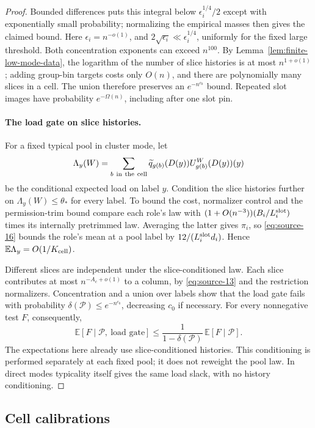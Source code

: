 \begin{proof}
Bounded differences puts this integral below
\(\epsilon_i^{1/4}/2\) except with exponentially small probability;
normalizing the empirical masses then gives the claimed bound.
Here \(\epsilon_i=n^{-o(1)}\), and
\(2\sqrt{\epsilon_i}\ll\epsilon_i^{1/4}\), uniformly for the fixed
large threshold. Both concentration exponents can exceed \(n^{100}\).
By Lemma~\ref{lem:finite-low-mode-data}, the logarithm of the number of
slice histories is at most \(n^{1+o(1)}\); adding group-bin targets costs
only \(O(n)\), and there are polynomially many slices in a cell. The
union therefore preserves an \(e^{-n^{c_0}}\) bound. Repeated slot
images have probability \(e^{-\Omega(n)}\), including after one slot pin.

\paragraph{The load gate on slice histories.}
For a fixed typical pool in cluster mode, let
\[
 \Lambda_y(W)=\sum_{b\ {\rm in\ the\ cell}}
     \widetilde q_{g(b)}(D(y))U_{g(b)}^W(D(y))(y)
\]
be the conditional expected load on label \(y\). Condition the slice
histories further on \(\Lambda_y(W)\le\theta_*\) for every label.
To bound the cost, normalizer control and the permission-trim bound compare
each role's law with \((1+O(n^{-3}))(B_i/L_i^{\rm slot})\) times its
internally pretrimmed law. Averaging the latter gives \(\pi_i\), so
\eqref{eq:source-16} bounds the role's mean at a pool label by
\(12/(L_i^{\rm slot}d_i)\). Hence
\(\mathbb E\Lambda_y=O(1/K_{\rm cell})\).

Different slices are independent under the slice-conditioned law. Each
slice contributes at most \(n^{-A_c+o(1)}\) to a column, by
\eqref{eq:source-13} and the restriction normalizers. Concentration and
a union over labels show that the load gate fails with probability
\(\delta(\mathcal P)\le e^{-n^{c_0}}\), decreasing \(c_0\) if necessary.
For every nonnegative test \(F\), consequently,
\[
 \mathbb E[F\mid\mathcal P,\ \text{load gate}]
 \le\frac{1}{1-\delta(\mathcal P)}\,
       \mathbb E[F\mid\mathcal P].
\]
The expectations here already use slice-conditioned histories. This
conditioning is performed separately at each fixed pool; it does not
reweight the pool law. In direct modes typicality itself gives the same
load slack, with no history conditioning.
\end{proof}

\subsection{Cell calibrations}
\label{sec:cell-calibrations}

